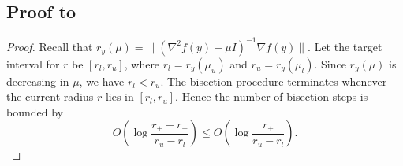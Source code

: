 \documentclass{article}
\begin{document}
\subsection*{Proof to }
\begin{proof}
    Recall that \(r_y(\mu)=\|(\nabla^2 f(y)+\mu I)^{-1}\nabla f(y)\|\).
    Let the target interval for \(r\) be \([r_l,r_u]\), where
    \(r_l=r_y(\mu_u)\) and \(r_u=r_y(\mu_l)\).
    Since \(r_y(\mu)\) is decreasing in \(\mu\), we have \(r_l<r_u\). The
    bisection procedure terminates whenever the current radius \(r\) lies in
    \([r_l,r_u]\). Hence the number of bisection steps is bounded by
    \begin{equation}
        \label{eq.rb-complexity-basic}
        O\left(
        \log\frac{r_+-r_-}{r_u-r_l}
        \right)
        \le
        O\left(
        \log\frac{r_+}{r_u-r_l}
        \right).
    \end{equation}


\end{proof}
\end{document}
